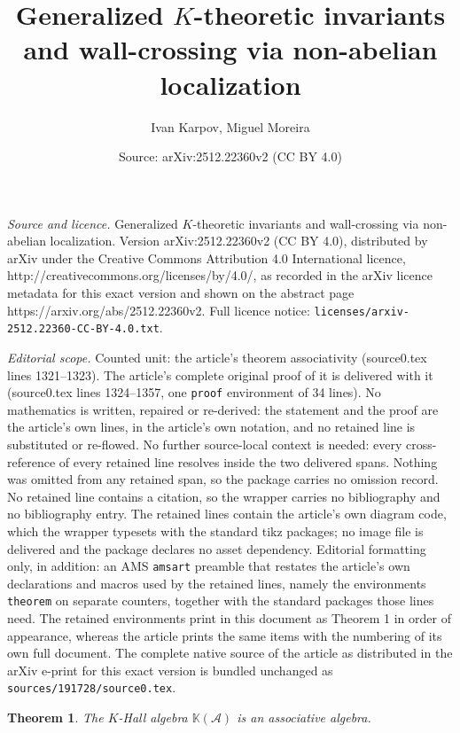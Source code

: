 \documentclass[10pt,a4paper]{amsart}
\title{Generalized $K$-theoretic invariants and wall-crossing via non-abelian localization}
\author{Ivan Karpov, Miguel Moreira}
\date{Source: arXiv:2512.22360v2 (CC BY 4.0)}
\newtheorem{theorem}{Theorem}
\newcommand{\BK}{{\mathbb{K}}}
\newcommand{\CA}{{\mathcal A}}
\begin{document}
\maketitle

\noindent\emph{Source and licence.} Generalized $K$-theoretic invariants and wall-crossing via non-abelian localization. Version arXiv:2512.22360v2 (CC BY 4.0), distributed by arXiv under the Creative Commons Attribution 4.0 International licence, http://creativecommons.org/licenses/by/4.0/, as recorded in the arXiv licence metadata for this exact version and shown on the abstract page https://arxiv.org/abs/2512.22360v2. Full licence notice: \texttt{licenses/arxiv-2512.22360-CC-BY-4.0.txt}.\par\smallskip

\noindent\textit{Editorial scope.} Counted unit: the article's theorem associativity (source0.tex lines 1321--1323). The article's complete original proof of it is delivered with it (source0.tex lines 1324--1357, one \texttt{proof} environment of 34 lines). No mathematics is written, repaired or re-derived: the statement and the proof are the article's own lines, in the article's own notation, and no retained line is substituted or re-flowed.  No further source-local context is needed: every cross-reference of every retained line resolves inside the two delivered spans.  Nothing was omitted from any retained span, so the package carries no omission record.  No retained line contains a citation, so the wrapper carries no bibliography and no bibliography entry.  The retained lines contain the article's own diagram code, which the wrapper typesets with the standard tikz packages; no image file is delivered and the package declares no asset dependency.  Editorial formatting only, in addition: an AMS \texttt{amsart} preamble that restates the article's own declarations and macros used by the retained lines, namely the environments \texttt{theorem} on separate counters, together with the standard packages those lines need.  The retained environments print in this document as Theorem 1 in order of appearance, whereas the article prints the same items with the numbering of its own full document.  The complete native source of the article as distributed in the arXiv e-print for this exact version is bundled unchanged as \texttt{sources/191728/source0.tex}.
\begin{theorem}\label{thm: associativity}
    The $K$-Hall algebra $\BK(\CA)$ is an associative algebra.
\end{theorem}
\end{document}
